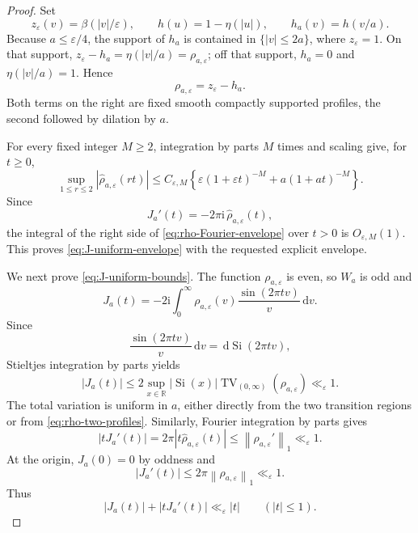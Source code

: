 \documentclass[11pt]{article}
\numberwithin{equation}{section}
\theoremstyle{definition}
\newcommand{\R}{\mathbb R}
\newcommand{\1}{\mathbf 1}
\newcommand{\ii}{\mathrm i}
\newcommand{\dd}{\,\mathrm d}
\newcommand{\TV}{\operatorname{TV}}
\newcommand{\Si}{\operatorname{Si}}
\newcommand{\norm}[1]{\left\lVert#1\right\rVert}
\begin{document}
\begin{proof}
Set
\[
 z_\varepsilon(v)=\beta(|v|/\varepsilon),\qquad
 h(u)=1-\eta(|u|),\qquad h_a(v)=h(v/a).
\]
Because \(a\le\varepsilon/4\), the support of \(h_a\) is contained in
\(\{|v|\le2a\}\), where \(z_\varepsilon=1\).  On that support,
\(z_\varepsilon-h_a=\eta(|v|/a)=\rho_{a,\varepsilon}\); off that
support, \(h_a=0\) and \(\eta(|v|/a)=1\).  Hence
\begin{equation}\label{eq:rho-two-profiles}
 \rho_{a,\varepsilon}=z_\varepsilon-h_a.
\end{equation}
Both terms on the right are fixed smooth compactly supported profiles,
the second followed by dilation by \(a\).

For every fixed integer \(M\ge2\), integration by parts \(M\) times
and scaling give, for \(t\ge0\),
\begin{equation}\label{eq:rho-Fourier-envelope}
 \sup_{1\le r\le2}|\widehat\rho_{a,\varepsilon}(rt)|
 \le C_{\varepsilon,M}\left\{
 \varepsilon(1+\varepsilon t)^{-M}
 +a(1+at)^{-M}\right\}.
\end{equation}
Since
\[
 J_a'(t)=-2\pi\ii\,\widehat\rho_{a,\varepsilon}(t),
\]
the integral of the right side of
\eqref{eq:rho-Fourier-envelope} over \(t>0\) is
\(O_{\varepsilon,M}(1)\).  This proves
\eqref{eq:J-uniform-envelope} with the requested explicit envelope.

We next prove \eqref{eq:J-uniform-bounds}.  The function
\(\rho_{a,\varepsilon}\) is even, so \(W_a\) is odd and
\[
 J_a(t)=-2\ii\int_0^\infty
 \rho_{a,\varepsilon}(v)\frac{\sin(2\pi tv)}v\dd v.
\]
Since
\[
 \frac{\sin(2\pi tv)}v\dd v=\dd\Si(2\pi tv),
\]
Stieltjes integration by parts yields
\[
 |J_a(t)|
 \le2\sup_{x\in\R}|\Si(x)|
 \TV_{(0,\infty)}(\rho_{a,\varepsilon})
 \ll_\varepsilon1.
\]
The total variation is uniform in \(a\), either directly from the two
transition regions or from \eqref{eq:rho-two-profiles}.  Similarly,
Fourier integration by parts gives
\[
 |tJ_a'(t)|
 =2\pi|t\widehat\rho_{a,\varepsilon}(t)|
 \le\norm{\rho_{a,\varepsilon}'}_1
 \ll_\varepsilon1.
\]
At the origin, \(J_a(0)=0\) by oddness and
\[
 |J_a'(t)|\le2\pi\norm{\rho_{a,\varepsilon}}_1
 \ll_\varepsilon1.
\]
Thus
\[
 |J_a(t)|+|tJ_a'(t)|\ll_\varepsilon |t|
 \qquad (|t|\le1).
\]


\end{proof}
\end{document}
